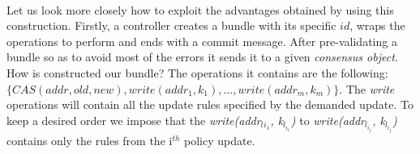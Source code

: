 \documentclass{article}
\theoremstyle{remark}
\begin{document}
\\
Let us look more closely how to exploit the advantages obtained by using this construction.
Firstly, a controller creates a bundle with its specific $id$, wraps the operations to perform and ends with a commit message. After pre-validating a bundle so as to avoid most of the errors it sends it to a given \emph{consensus object.} How is constructed our bundle? The operations it contains are the following: $\lbrace CAS(addr,old,new), write(addr_1, k_1),\ldots, write(addr_m, k_m)\rbrace$. The \emph{write} operations will contain all the update rules specified by the demanded update. To keep a desired order we impose that the 
\emph{write(addr$_l{_{i_1}}$, k$_{l_{i_1}}$)} to 
\emph{write(addr$_{l_{i_j}}$, k$_{l_{i_j}}$)} contains only the rules from the i$^{th}$ policy update.
  
\end{document}

